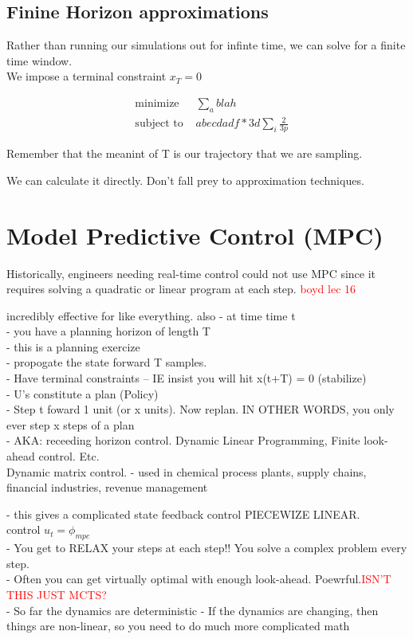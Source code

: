 \documentclass[11pt]{article}
\newcommand\later[1]{\textcolor{red}{#1}}
\begin{document}
\subsection{Finine Horizon approximations}
Rather than running our simulations out for infinte time, we can solve for a finite time window.\\

We impose a terminal constraint $x_T = 0$

\begin{align*}  
    &\textrm{minimize  }  & \sum_a blah\\
    &\textrm{subject to  } & abecdadf * 3d \sum_i \frac{2}{3p}
\end{align*}

Remember that the meanint of T is our trajectory that we are sampling.

We can calculate it directly. Don't fall prey to approximation techniques.

\section{Model Predictive Control (MPC)}
Historically, engineers needing real-time control could not use MPC since it requires solving
a quadratic or linear program at each step. \later{boyd lec 16}

incredibly effective for like everything.
also
- at time time t\\
- you have a planning horizon of length T\\
- this is a planning exercize\\
- propogate the state forward T samples.\\
- Have terminal constraints -- IE insist you will hit x(t+T) = 0 (stabilize)\\
- U's constitute a plan (Policy)\\
- Step t foward 1 unit (or x units). Now replan. IN OTHER WORDS, you only ever step x steps
of a plan\\
- AKA: receeding horizon control. Dynamic Linear Programming,  Finite look-ahead control. Etc.\\
Dynamic matrix control. 
- used in chemical process plants, supply chains, financial industries, revenue management

- this gives a complicated state feedback control PIECEWIZE LINEAR. \\
control $u_t = \phi_{mpc} $\\
- You get to RELAX your steps at each step!! You solve a complex problem every step.\\
- Often you can get virtually optimal with enough look-ahead. Poewrful.\later{ISN'T THIS JUST MCTS?}\\
- So far the dynamics are deterministic
- If the dynamics are changing, then things are  non-linear, so you need to do much more complicated
math
\end{document}

